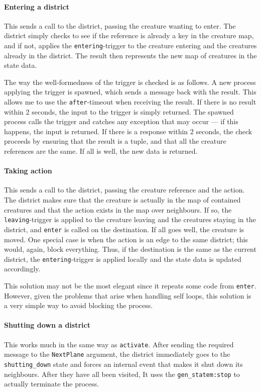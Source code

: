 \paragraph{Entering a district} This sends a call to the district, passing the creature wanting to enter. The district simply checks to see if the reference is already a key in the creature map, and if not, applies the \texttt{entering}-trigger to the creature entering and the creatures already in the district. The result then represents the  new map of creatures in the state data.

The way the well-formedness of the trigger is checked is as follows. A new process applying the trigger is spawned, which sends a message back with the result. This allows me to use the \texttt{after}-timeout when receiving the result. If there is no result within 2 seconds, the input to the trigger is simply returned. The spawned process calls the trigger and catches any exception that may occur --- if this happens, the input is returned. If there is a response within 2 seconds, the check proceeds by ensuring that the result is a tuple, and that all the creature references are the same. If all is well, the new data is returned.

\paragraph{Taking action} This sends a call to the district, passing the creature reference and the action. The district makes sure that the creature is actually in the map of contained creatures and that the action exists in the map over neighbours. If so, the \texttt{leaving}-trigger is applied to the creature leaving and the creatures staying in the district, and \texttt{enter} is called on the destination. If all goes well, the creature is moved. One special case is when the action is an edge to the same district; this would, again, block everything. Thus, if the destination is the same as the current district, the \texttt{entering}-trigger is applied locally and the state data is updated accordingly.

This solution may not be the most elegant since it repeats some code from \texttt{enter}. However, given the problems that arise when handling self loops, this solution is a very simple way to avoid blocking the process.

\paragraph{Shutting down a district} This works much in the same way as \texttt{activate}. After sending the required message to the \texttt{NextPlane} argument, the district immediately goes to the \texttt{shutting\_down} state and forces an internal event that makes it shut down its neighbours. After they have all been visited, It uses the \texttt{gen\_statem:stop} to actually terminate the process.




